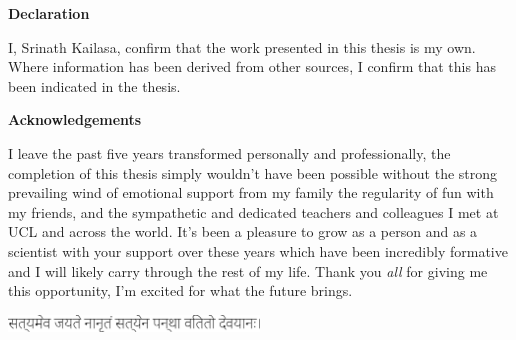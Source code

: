 \thispagestyle{plain}

\begin{center}
    \textbf{Declaration}
\end{center}
I, Srinath Kailasa, confirm that the work presented in this thesis is my own. Where information has been derived from other sources, I confirm that this has been indicated in the thesis.


\begin{center}
    \textbf{Acknowledgements}
\end{center}

I leave the past five years transformed personally and professionally, the completion of this thesis simply wouldn't have been possible without the strong prevailing wind of emotional support from my family the regularity of fun with my friends, and the sympathetic and dedicated teachers and colleagues I met at UCL and across the world. It's been a pleasure to grow as a person and as a scientist with your support over these years which have been incredibly formative and I will likely carry through the rest of my life. Thank you \textit{all} for giving me this opportunity, I'm excited for what the future brings.

\begin{center}
    \includegraphics[width=0.5\textwidth]{images/satyameva_jayate.pdf}
\end{center}